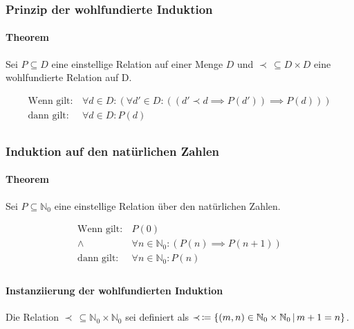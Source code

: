 		    \subsubsection{Prinzip der wohlfundierte Induktion}
			    \paragraph{Theorem}
				    Sei $ P \subseteq D $ eine einstellige Relation auf einer Menge $ D $ und $ \prec \,\subseteq D \times D $ eine wohlfundierte Relation auf D.
				    
				    \begin{align*}
					    \text{Wenn gilt:} & \,\forall d \in D : (\forall d' \in D : ((d' \prec d \implies P(d')) \implies P(d))) \\
					    \text{dann gilt:} & \,\forall d \in D : P(d) \\
				    \end{align*}
			    

		    \subsubsection{Induktion auf den natürlichen Zahlen}
			    \paragraph{Theorem}
				    Sei $ P \subseteq \mathbb{N} _ 0 $ eine einstellige Relation über den natürlichen Zahlen.
				    
				    \begin{align*}
					    \text{Wenn gilt:} & \,P(0) \\
					    \land & \,\forall n \in \mathbb{N} _ 0 : (P(n) \implies P(n + 1)) \\
					    \text{dann gilt:} & \,\forall n \in \mathbb{N} _ 0 : P(n) \\
				    \end{align*}
			    
			    \paragraph{Instanziierung der wohlfundierten Induktion}
				    Die Relation $ \prec \,\subseteq \mathbb{N} _ 0 \times \mathbb{N} _ 0 $ sei definiert als $ \prec \,\coloneqq \{ (m, n) \in \mathbb{N} _ 0 \times \mathbb{N} _ 0 \,\vert\, m + 1 = n \} $.
				    

